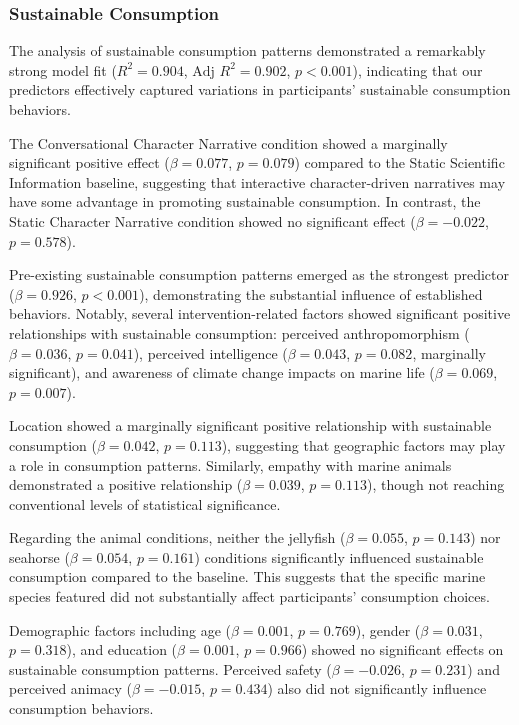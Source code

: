\documentclass[sigconf, nonacm]{acmart}
\begin{document}
\subsubsection{Sustainable Consumption}
The analysis of sustainable consumption patterns demonstrated a remarkably strong model fit ($R^2 = 0.904$, $\text{Adj } R^2 = 0.902$, $p < 0.001$), indicating that our predictors effectively captured variations in participants' sustainable consumption behaviors.

The Conversational Character Narrative condition showed a marginally significant positive effect ($\beta = 0.077$, $p = 0.079$) compared to the Static Scientific Information baseline, suggesting that interactive character-driven narratives may have some advantage in promoting sustainable consumption. In contrast, the Static Character Narrative condition showed no significant effect ($\beta = -0.022$, $p = 0.578$).

Pre-existing sustainable consumption patterns emerged as the strongest predictor ($\beta = 0.926$, $p < 0.001$), demonstrating the substantial influence of established behaviors. Notably, several intervention-related factors showed significant positive relationships with sustainable consumption: perceived anthropomorphism ($\beta = 0.036$, $p = 0.041$), perceived intelligence ($\beta = 0.043$, $p = 0.082$, marginally significant), and awareness of climate change impacts on marine life ($\beta = 0.069$, $p = 0.007$).

Location showed a marginally significant positive relationship with sustainable consumption ($\beta = 0.042$, $p = 0.113$), suggesting that geographic factors may play a role in consumption patterns. Similarly, empathy with marine animals demonstrated a positive relationship ($\beta = 0.039$, $p = 0.113$), though not reaching conventional levels of statistical significance.

Regarding the animal conditions, neither the jellyfish ($\beta = 0.055$, $p = 0.143$) nor seahorse ($\beta = 0.054$, $p = 0.161$) conditions significantly influenced sustainable consumption compared to the baseline. This suggests that the specific marine species featured did not substantially affect participants' consumption choices.

Demographic factors including age ($\beta = 0.001$, $p = 0.769$), gender ($\beta = 0.031$, $p = 0.318$), and education ($\beta = 0.001$, $p = 0.966$) showed no significant effects on sustainable consumption patterns. Perceived safety ($\beta = -0.026$, $p = 0.231$) and perceived animacy ($\beta = -0.015$, $p = 0.434$) also did not significantly influence consumption behaviors.
\end{document}
